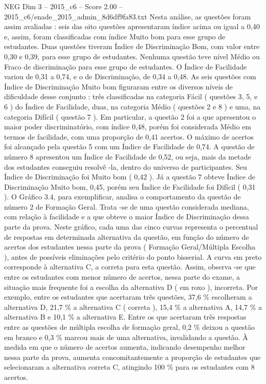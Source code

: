 \begin{textsample}{NEG Dim 3 – 2015\_c6 – Score 2.00 – 2015\_c6/enade\_2015\_admin\_8d6df9fa83.txt}
Nesta análise, as questões foram assim avaliadas : seis das oito questões apresentaram índice acima ou igual a 0,40 e, assim, foram classificadas com índice Muito bom para esse grupo de estudantes.
Duas questões tiveram Índice de Discriminação Bom, com valor entre 0,30 e 0,39, para esse grupo de estudantes.
Nenhuma questão teve nível Médio ou Fraco de discriminação para esse grupo de estudantes.
O Índice de Facilidade variou de 0,31 a 0,74, e o de Discriminação, de 0,34 a 0,48.
As seis questões com Índice de Discriminação Muito bom figuraram entre os diversos níveis de dificuldade desse conjunto : três classificadas na categoria Fácil ( questões 3, 5, e 6 ) do Índice de Facilidade, duas, na categoria Médio ( questões 2 e 8 ) e uma, na categoria Difícil ( questão 7 ).
Em particular, a questão 2 foi a que apresentou o maior poder discriminatório, com índice 0,48, porém foi considerada Médio em termos de facilidade, com uma proporção de 0,41 acertos.
O máximo de acertos foi alcançado pela questão 5 com um Índice de Facilidade de 0,74.
A questão de número 8 apresentou um Índice de Facilidade de 0,52, ou seja, mais da metade dos estudantes conseguiu resolvê -la, dentro do universo de participantes.
Seu Índice de Discriminação foi Muito bom ( 0,42 ).
Já a questão 7 obteve Índice de Discriminação Muito bom, 0,45, porém seu Índice de Facilidade foi Difícil ( 0,31 ).
O Gráfico 3.4, para exemplificar, analisa o comportamento da questão de número 2 de Formação Geral.
Trata -se de uma questão considerada mediana, com relação à facilidade e a que obteve o maior Índice de Discriminação dessa parte da prova.
Neste gráfico, cada uma das cinco curvas representa o percentual de respostas em determinada alternativa da questão, em função do número de acertos dos estudantes nessa parte da prova ( Formação Geral/Múltipla Escolha ), antes de possíveis eliminações pelo critério do ponto bisserial.
A curva em preto corresponde à alternativa C, a correta para esta questão.
Assim, observa -se que entre os estudantes com menor número de acertos, nessa parte do exame, a situação mais frequente foi a escolha da alternativa D ( em roxo ), incorreta.
Por exemplo, entre os estudantes que acertaram três questões, 37,6 \% escolheram a alternativa D, 21,7 \% a alternativa C ( correta ), 15,4 \% a alternativa A, 14,7 \% a alternativa B e 10,1 \% a alternativa E.
Entre os que acertaram três respostas entre as questões de múltipla escolha de formação geral, 0,2 \% deixou a questão em branco e 0,3 \% marcou mais de uma alternativa, invalidando a questão.
À medida em que o número de acertos aumenta, indicando desempenho melhor nessa parte da prova, aumenta concomitantemente a proporção de estudantes que selecionaram a alternativa correta C, atingindo 100 \% para os estudantes com 8 acertos.

\end{textsample}
